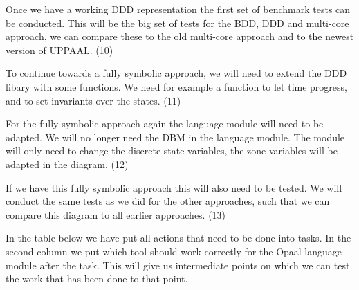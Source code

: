 Once we have a working DDD representation the first set of benchmark tests can be conducted. This will be the big set of tests for the BDD, DDD and multi-core approach, we can compare these to the old multi-core approach and to the newest version of UPPAAL. (10)

To continue towards a fully symbolic approach, we will need to extend the DDD libary with some functions. We need for example a function to let time progress, and to set invariants over the states. (11)

For the fully symbolic approach again the language module will need to be adapted. We will no longer need the DBM in the language module. The module will only need to change the discrete state variables, the zone variables will be adapted in the diagram. (12)

If we have this fully symbolic approach this will also need to be tested. We will conduct the same tests as we did for the other approaches, such that we can compare this diagram to all earlier approaches. (13)

In the table below we have put all actions that need to be done into tasks. In the second column we put which tool should work correctly for the Opaal language module after the task. This will give us intermediate points on which we can test the work that has been done to that point.

